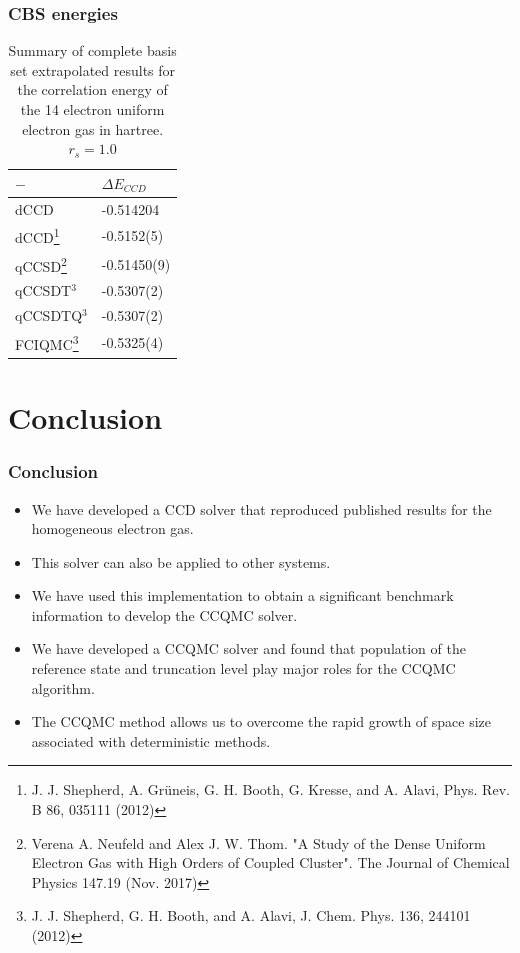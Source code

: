 \documentclass{beamer}
\begin{document}
\begin{frame}
\frametitle{CBS energies}
\begin{table}[h]
\centering
\caption{\tiny Summary of complete basis set extrapolated results for the correlation energy of the 14 electron uniform electron gas in hartree. $r_s = 1.0$} \label{tab:CCDQMC}
\tiny  %
\begin{tabular}{ll}
$-$ &  $\Delta E_{CCD}$ \\
\hline
\hline
dCCD & -0.514204 \\
dCCD\footnote{\tiny J. J. Shepherd, A. Grüneis, G. H. Booth, G. Kresse, and A. Alavi, Phys. Rev. B 86, 035111 (2012)} & -0.5152(5) \\
\hline
qCCSD\footnote{\tiny Verena A. Neufeld and Alex J. W. Thom. "A Study of the Dense Uniform Electron Gas with High Orders of Coupled Cluster". The Journal of Chemical Physics 147.19 (Nov. 2017)} & -0.51450(9) \\
qCCSDT$^3$ & -0.5307(2) \\
qCCSDTQ$^3$ & -0.5307(2) \\			
\hline
FCIQMC\footnote{\tiny J. J. Shepherd, G. H. Booth, and A. Alavi, J. Chem. Phys. 136, 244101 (2012)} & -0.5325(4) \\
\hline     
\end{tabular}
\end{table}

\end{frame}


\section{Conclusion}

\begin{frame}
\frametitle{Conclusion}
\begin{itemize}
\item We have developed a CCD solver that reproduced published results for the homogeneous electron gas.
\item This solver can also be applied to other systems.
\item We have used this implementation to obtain a significant benchmark information to develop the CCQMC solver.
\item We have developed a CCQMC solver and found that population of the reference state and truncation level play major roles for the CCQMC algorithm.
\item The CCQMC method allows us to overcome the rapid growth of space size associated with deterministic methods.
\end{itemize}
\end{frame}
\end{document}
